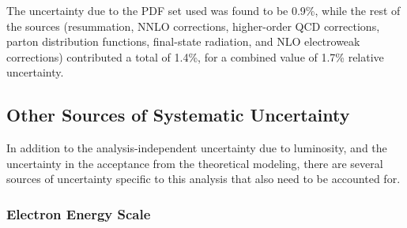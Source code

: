 
The uncertainty due to the PDF set used 
was found to be 0.9\%, 
while the rest of the sources 
(resummation, NNLO corrections, higher-order QCD corrections, 
parton distribution functions, 
final-state radiation, and NLO electroweak corrections) 
contributed a total of 1.4\%, 
for a combined value of 1.7\% relative uncertainty.  





\subsection{Other Sources of Systematic Uncertainty}
\label{anMeth:SystsOther}


In addition to the analysis-independent 
uncertainty due to luminosity, 
and the uncertainty in the acceptance 
from the theoretical modeling, 
there are several sources of 
uncertainty specific to this analysis 
that also need to be accounted for.  

\subsubsection{Electron Energy Scale}
\label{anMeth:SystsOtherEleEScale}


